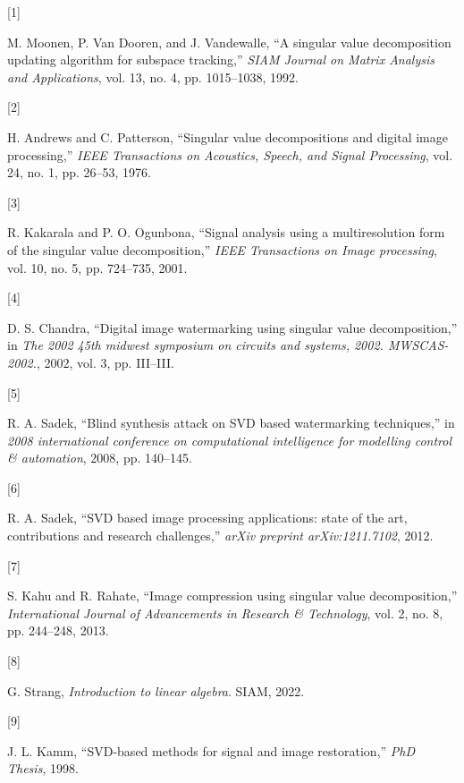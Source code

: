 \documentclass[
  journal,
]{IEEEtran}%
\newlength{\cslhangindent}
\newlength{\csllabelwidth}
\newenvironment{CSLReferences}[2] %
 {\begin{list}{}{%
  \setlength{\itemindent}{0pt}
  \setlength{\leftmargin}{0pt}
  \setlength{\parsep}{0pt}
  \ifodd #1
   \setlength{\leftmargin}{\cslhangindent}
   \setlength{\itemindent}{-1\cslhangindent}
  \fi
  \setlength{\itemsep}{#2\baselineskip}}}
 {\end{list}}
\newcommand{\CSLLeftMargin}[1]{\parbox[t]{\csllabelwidth}{\strut#1\strut}}
\newcommand{\CSLRightInline}[1]{\parbox[t]{\linewidth - \csllabelwidth}{\strut#1\strut}}
\begin{document}
\label{refs}
\begin{CSLReferences}{0}{0}
\CSLLeftMargin{{[}1{]} }%
\CSLRightInline{M. Moonen, P. Van Dooren, and J. Vandewalle, {``A
singular value decomposition updating algorithm for subspace
tracking,''} \emph{SIAM Journal on Matrix Analysis and Applications},
vol. 13, no. 4, pp. 1015--1038, 1992. }

\CSLLeftMargin{{[}2{]} }%
\CSLRightInline{H. Andrews and C. Patterson, {``Singular value
decompositions and digital image processing,''} \emph{IEEE Transactions
on Acoustics, Speech, and Signal Processing}, vol. 24, no. 1, pp.
26--53, 1976. }

\CSLLeftMargin{{[}3{]} }%
\CSLRightInline{R. Kakarala and P. O. Ogunbona, {``Signal analysis using
a multiresolution form of the singular value decomposition,''}
\emph{IEEE Transactions on Image processing}, vol. 10, no. 5, pp.
724--735, 2001. }

\CSLLeftMargin{{[}4{]} }%
\CSLRightInline{D. S. Chandra, {``Digital image watermarking using
singular value decomposition,''} in \emph{The 2002 45th midwest
symposium on circuits and systems, 2002. MWSCAS-2002.}, 2002, vol. 3,
pp. III--III. }

\CSLLeftMargin{{[}5{]} }%
\CSLRightInline{R. A. Sadek, {``{Blind synthesis attack on SVD based
watermarking techniques},''} in \emph{2008 international conference on
computational intelligence for modelling control \& automation}, 2008,
pp. 140--145. }

\CSLLeftMargin{{[}6{]} }%
\CSLRightInline{R. A. Sadek, {``{SVD based image processing
applications: state of the art, contributions and research
challenges},''} \emph{arXiv preprint arXiv:1211.7102}, 2012. }

\CSLLeftMargin{{[}7{]} }%
\CSLRightInline{S. Kahu and R. Rahate, {``Image compression using
singular value decomposition,''} \emph{International Journal of
Advancements in Research \& Technology}, vol. 2, no. 8, pp. 244--248,
2013. }

\CSLLeftMargin{{[}8{]} }%
\CSLRightInline{G. Strang, \emph{Introduction to linear algebra}. SIAM,
2022. }

\CSLLeftMargin{{[}9{]} }%
\CSLRightInline{J. L. Kamm, {``{SVD-based methods for signal and image
restoration},''} \emph{PhD Thesis}, 1998. }


\end{CSLReferences}
\end{document}
